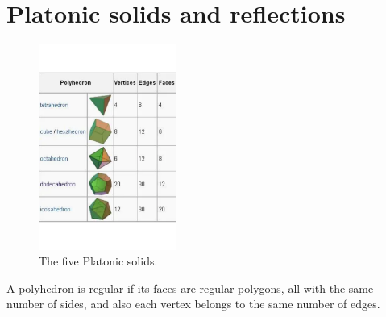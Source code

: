 \documentclass[../main.tex]{subfiles}
\begin{document}
\section{Platonic solids and reflections}
\begin{figure}[ht]
    \centering
    \includegraphics[width=0.4\textwidth]{platonic solids.pdf}
    \caption{The five Platonic solids.}
    \label{platonic solids}
\end{figure}

\begin{definition}
    A polyhedron is regular if its faces are regular polygons, all with the same number of sides, and also each vertex belongs to the same number of edges.
\end{definition}
\end{document}

